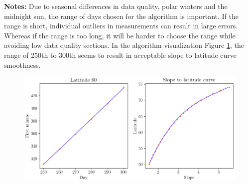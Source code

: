 \noindent
\textbf{Notes:}
Due to seasonal differences in data quality, polar winters and the midnight sun, the range of days chosen for the algorithm is important. If the range is short, individual outliers in measurements can result in large errors. Whereas if the range is too long, it will be harder to choose the range while avoiding low data quality sections. In the algorithm visualization Figure \ref{fig_slope_to_latitude}, the range of 250th to 300th seems to result in acceptable slope to latitude curve smoothness.
\newpage

\begin{figure}[ht!]
\centering
\includegraphics[width=1\linewidth]{pics/slope_to_latitude3}



\label{fig_slope_to_latitude}
\end{figure}



